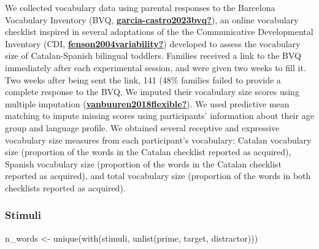 \documentclass[
  letterpaper,
  DIV=11,
  numbers=noendperiod]{scrartcl}
\newenvironment{Shaded}{\begin{snugshade}}{\end{snugshade}}
\newcommand{\FunctionTok}[1]{\textcolor[rgb]{0.28,0.35,0.67}{#1}}
\newcommand{\NormalTok}[1]{\textcolor[rgb]{0.00,0.23,0.31}{#1}}
\newcommand{\OtherTok}[1]{\textcolor[rgb]{0.00,0.23,0.31}{#1}}
\begin{document}
We collected vocabulary data using parental responses to the Barcelona
Vocabulary Inventory (BVQ,
\protect\hyperlink{ref-garcia-castro2023bvq}{\textbf{garcia-castro2023bvq?}}),
an online vocabulary checklist inspired in several adaptations of the
the Communicative Developmental Inventory (CDI,
\protect\hyperlink{ref-fenson2004variability}{\textbf{fenson2004variability?}})
developed to assess the vocabulary size of Catalan-Spanish bilingual
toddlers. Families received a link to the BVQ immediately after each
experimental session, and were given two weeks to fill it. Two weeks
after being sent the link, 141 (48\% families failed to provide a
complete response to the BVQ. We imputed their vocabulary size scores
using multiple imputation
(\protect\hyperlink{ref-vanbuuren2018flexible}{\textbf{vanbuuren2018flexible?}}).
We used predictive mean matching to impute missing scores using
participants' information about their age group and language profile. We
obtained several receptive and expressive vocabulary size measures from
each participant's vocabulary: Catalan vocabulary size (proportion of
the words in the Catalan checklist reported as acquired), Spanish
vocabulary size (proportion of the words in the Catalan checklist
reported as acquired), and total vocabulary size (proportion of the
words in both checklists reported as acquired).

\hypertarget{stimuli}{%
\subsubsection{Stimuli}\label{stimuli}}

\begin{Shaded}
\begin{Highlighting}[]
\NormalTok{n\_words }\OtherTok{\textless{}{-}} \FunctionTok{unique}\NormalTok{(}\FunctionTok{with}\NormalTok{(stimuli, }\FunctionTok{unlist}\NormalTok{(prime, target, distractor)))}
\end{Highlighting}
\end{Shaded}
\end{document}

